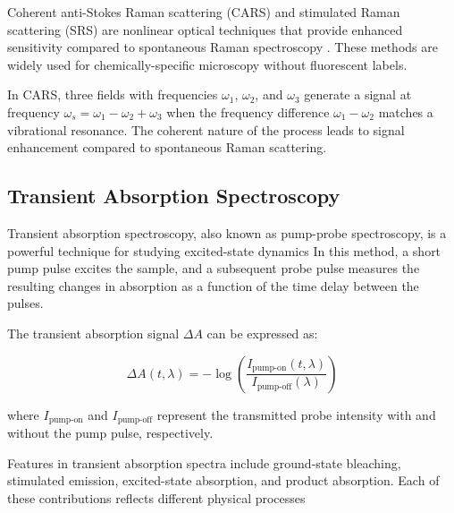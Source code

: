 \noindent Coherent anti-Stokes Raman scattering (CARS) and stimulated Raman scattering (SRS) are nonlinear optical techniques that provide enhanced sensitivity compared to spontaneous Raman spectroscopy \cite{boyd2008contents}. These methods are widely used for chemically-specific microscopy without fluorescent labels.

\noindent In CARS, three fields with frequencies $\omega_1$, $\omega_2$, and $\omega_3$ generate a signal at frequency $\omega_s = \omega_1 - \omega_2 + \omega_3$ when the frequency difference $\omega_1 - \omega_2$ matches a vibrational resonance. The coherent nature of the process leads to signal enhancement compared to spontaneous Raman scattering.

\subsection{Transient Absorption Spectroscopy}
\label{subsec:transient_absorption}

\noindent Transient absorption spectroscopy, also known as pump-probe spectroscopy, is a powerful technique for studying excited-state dynamics %
In this method, a short pump pulse excites the sample, and a subsequent probe pulse measures the resulting changes in absorption as a function of the time delay between the pulses.

\noindent The transient absorption signal $\Delta A$ can be expressed as:

\begin{equation}
	\Delta A(t, \lambda) = -\log\left(\frac{I_{\text{pump-on}}(t, \lambda)}{I_{\text{pump-off}}(\lambda)}\right)
	\label{eq:transient_absorption}
\end{equation}

\noindent where $I_{\text{pump-on}}$ and $I_{\text{pump-off}}$ represent the transmitted probe intensity with and without the pump pulse, respectively.

\noindent Features in transient absorption spectra include ground-state bleaching, stimulated emission, excited-state absorption, and product absorption. Each of these contributions reflects different physical processes %

